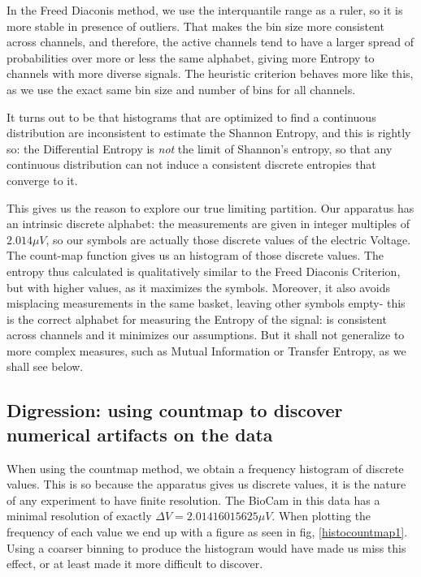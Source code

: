 \documentclass[10pt]{article}
\begin{document}
In the Freed Diaconis method, we use the interquantile range as a ruler, so it is more stable in presence of outliers. That makes the bin size more consistent across channels, and therefore, the active channels tend to have a larger spread of probabilities over more or less the same alphabet, giving more Entropy to channels with more diverse signals. The heuristic criterion behaves more like this, as we use the exact same bin size and number of bins for all channels. 

It turns out to be that histograms that are optimized to find a continuous distribution are inconsistent to estimate the Shannon Entropy, and this is rightly so: the Differential Entropy is \emph{not} the limit of Shannon's entropy, so that any continuous distribution can not induce a consistent discrete entropies that converge to it. 

This gives us the reason to explore our true limiting partition. Our apparatus has an intrinsic discrete alphabet: the measurements are given in integer multiples of $2.014 \mu V$, so our symbols are actually those discrete values of the electric Voltage. The count-map function gives us an histogram of those discrete values. The entropy thus calculated is qualitatively similar to the Freed Diaconis Criterion, but with higher values, as it maximizes the symbols. Moreover, it also avoids misplacing measurements in the same basket, leaving other symbols empty- this is the correct alphabet for measuring the Entropy of
the signal: is consistent across channels and it minimizes our assumptions. But it shall
not generalize to more complex measures, such as Mutual Information or
Transfer Entropy, as we shall see below.

\subsection{Digression: using countmap to discover numerical artifacts on
  the data}

When using the countmap method, we obtain a frequency histogram of discrete values.
This is so because the apparatus gives us discrete values, it is the nature
of any experiment to have finite resolution. The BioCam in this data has a
minimal resolution of exactly $\Delta V=2.01416015625 \mu V $.
When plotting the frequency
of each value we end up with a figure as seen in fig, \ref{histocountmap1}.
Using a coarser binning to produce the histogram would have made us miss
this effect, or at least made it more difficult to discover. 
\end{document}
